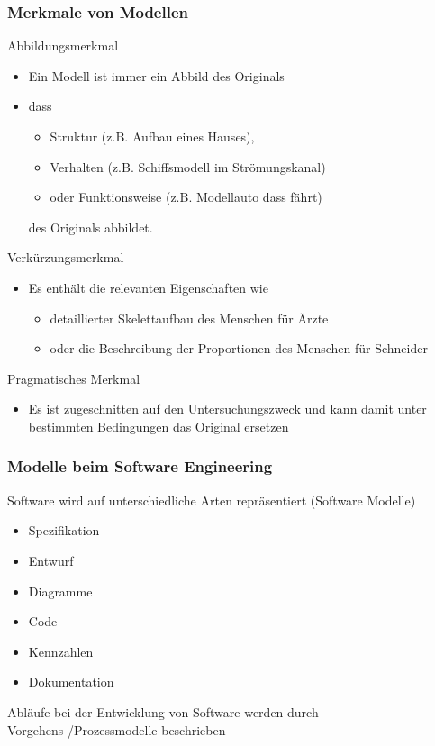 \begin{frame}
\frametitle{Merkmale von Modellen}
	Abbildungsmerkmal
	\begin{itemize}
		\item Ein Modell ist immer ein Abbild des Originals
		\item dass 
		\begin{itemize}
			\item Struktur (z.B. Aufbau eines Hauses), 
			\item Verhalten (z.B. Schiffsmodell im Strömungskanal)
			\item oder Funktionsweise (z.B. Modellauto dass fährt)
		\end{itemize}
		des Originals abbildet.
	\end{itemize}
	\bigskip
	Verkürzungsmerkmal
	\begin{itemize}
		\item Es enthält die relevanten Eigenschaften wie
		\begin{itemize}
			\item detaillierter Skelettaufbau des Menschen für Ärzte
			\item oder die Beschreibung der Proportionen des Menschen für Schneider
		\end{itemize}
	\end{itemize}
	\bigskip
	Pragmatisches Merkmal
	\begin{itemize}
		\item Es ist zugeschnitten auf den Untersuchungszweck und kann damit
		unter bestimmten Bedingungen das Original ersetzen
	\end{itemize}
	\bigskip
\end{frame}

\begin{frame}
\frametitle{Modelle beim Software Engineering}
	Software wird auf unterschiedliche Arten repräsentiert (Software Modelle)
		\begin{itemize}
			\item Spezifikation
			\item Entwurf
			\item Diagramme
			\item Code
			\item Kennzahlen
			\item Dokumentation
		\end{itemize}
	\bigskip
	Abläufe bei der Entwicklung von Software werden durch Vorgehens-/Prozessmodelle beschrieben
\end{frame}


